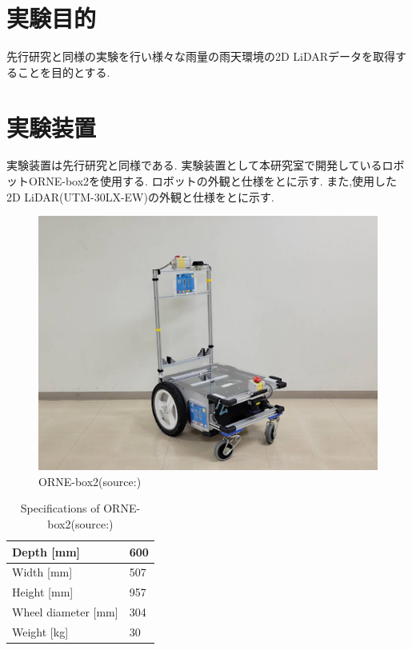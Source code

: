 \section{実験目的}

先行研究\cite{mura}と同様の実験を行い様々な雨量の雨天環境の2D LiDARデータを取得することを目的とする.

\section{実験装置}

実験装置は先行研究\cite{mura}と同様である.
実験装置として本研究室で開発しているロボットORNE-box2\cite{orne}を使用する.
ロボットの外観と仕様をとに示す.
また,使用した2D LiDAR(UTM-30LX-EW)の外観と仕様をとに示す.

\begin{figure}[H]
  \centering
  \includegraphics[keepaspectratio, scale=0.4]{images/png/orne-box2.png}
  \caption{ORNE-box2(source:\cite{mura})}
  \label{Fig:4.1}
\end{figure}

\newpage
\vspace{10zh}

\begin{table}[H]
  \centering
  \caption[Specifications of ORNE-box2]{Specifications of ORNE-box2(source:\cite{mura}\cite{orne})}
  \begin{tabular}{|l|l|}
  \hline
  Depth {[}mm{]}          & 600 \\ \hline
  Width {[}mm{]}          & 507 \\ \hline
  Height {[}mm{]}         & 957 \\ \hline
  Wheel diameter {[}mm{]} & 304 \\ \hline
  Weight {[}kg{]}         & 30  \\ \hline
  \end{tabular}
  \label{table:ORNE-box2}
  \end{table}

